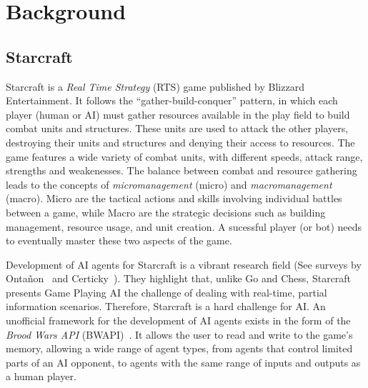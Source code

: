 \section{Background}\label{section:background}

\subsection{Starcraft}

Starcraft is a \emph{Real Time Strategy} (RTS) game published by
Blizzard Entertainment. It follows the ``gather-build-conquer''
pattern, in which each player (human or AI) must gather resources
available in the play field to build combat units and
structures. These units are used to attack the other players,
destroying their units and structures and denying their access to
resources. The game features a wide variety of combat units, with
different speeds, attack range, strengths and weakenesses. The balance
between combat and resource gathering leads to the concepts of
\emph{micromanagement} (micro) and \emph{macromanagement}
(macro). Micro are the tactical actions and skills involving
individual battles between a game, while Macro are the strategic
decisions such as building management, resource usage, and unit
creation. A sucessful player (or bot) needs to eventually master
these two aspects of the game.

Development of AI agents for Starcraft is a vibrant research field
(See surveys by Onta\~non~\cite{Ontanon13AICompetitionSurvey} and
Certicky~\cite{Certicky17SurveyCompetitionsBots}). They highlight that, unlike Go and Chess,
Starcraft presents Game Playing AI the challenge of dealing with
real-time, partial information scenarios. Therefore, Starcraft is a
hard challenge for AI. An unofficial framework for the development of
AI agents exists in the form of the \emph{Brood Wars API}
(BWAPI)~\cite{BWAPI}. It allows the user to read and write to the
game's memory, allowing a wide range of agent types, from agents that
control limited parts of an AI opponent, to agents with the same range
of inputs and outputs as a human player.



